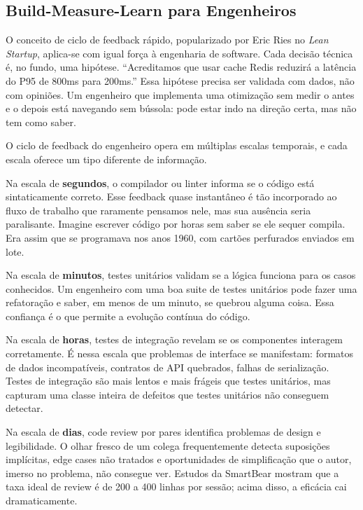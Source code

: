 \subsection{Build-Measure-Learn para Engenheiros}

O conceito de ciclo de feedback rápido, popularizado por Eric Ries no
\emph{Lean Startup}, aplica-se com igual força à engenharia de software.
Cada decisão técnica é, no fundo, uma hipótese. ``Acreditamos que
usar cache Redis reduzirá a latência do P95 de 800ms para 200ms.'' Essa
hipótese precisa ser validada com dados, não com opiniões. Um engenheiro
que implementa uma otimização sem medir o antes e o depois está navegando
sem bússola: pode estar indo na direção certa, mas não tem como saber.

O ciclo de feedback do engenheiro opera em múltiplas escalas temporais, e
cada escala oferece um tipo diferente de informação.

Na escala de \textbf{segundos}, o compilador ou linter informa se o código
está sintaticamente correto. Esse feedback quase instantâneo é tão
incorporado ao fluxo de trabalho que raramente pensamos nele, mas sua
ausência seria paralisante. Imagine escrever código por horas sem saber
se ele sequer compila. Era assim que se programava nos anos 1960, com
cartões perfurados enviados em lote.

Na escala de \textbf{minutos}, testes unitários validam se a lógica
funciona para os casos conhecidos. Um engenheiro com uma boa suite de
testes unitários pode fazer uma refatoração e saber, em menos de um
minuto, se quebrou alguma coisa. Essa confiança é o que permite a
evolução contínua do código.

Na escala de \textbf{horas}, testes de integração revelam se os
componentes interagem corretamente. É nessa escala que problemas de
interface se manifestam: formatos de dados incompatíveis, contratos de
API quebrados, falhas de serialização. Testes de integração são mais
lentos e mais frágeis que testes unitários, mas capturam uma classe
inteira de defeitos que testes unitários não conseguem detectar.

Na escala de \textbf{dias}, code review por pares identifica problemas
de design e legibilidade. O olhar fresco de um colega frequentemente
detecta suposições implícitas, edge cases não tratados e oportunidades
de simplificação que o autor, imerso no problema, não consegue ver.
Estudos da SmartBear mostram que a taxa ideal de review é de 200 a 400
linhas por sessão; acima disso, a eficácia cai dramaticamente.

